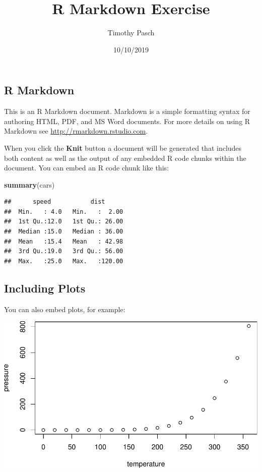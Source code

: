 \documentclass[]{article}
\title{R Markdown Exercise}
\author{Timothy Pasch}
\date{10/10/2019}
\newenvironment{Shaded}{\begin{snugshade}}{\end{snugshade}}
\newcommand{\KeywordTok}[1]{\textcolor[rgb]{0.13,0.29,0.53}{\textbf{#1}}}
\newcommand{\NormalTok}[1]{#1}
\begin{document}
\maketitle

\hypertarget{r-markdown}{%
\subsection{R Markdown}\label{r-markdown}}

This is an R Markdown document. Markdown is a simple formatting syntax
for authoring HTML, PDF, and MS Word documents. For more details on
using R Markdown see \url{http://rmarkdown.rstudio.com}.

When you click the \textbf{Knit} button a document will be generated
that includes both content as well as the output of any embedded R code
chunks within the document. You can embed an R code chunk like this:

\begin{Shaded}
\begin{Highlighting}[]
\KeywordTok{summary}\NormalTok{(cars)}
\end{Highlighting}
\end{Shaded}

\begin{verbatim}
##      speed           dist       
##  Min.   : 4.0   Min.   :  2.00  
##  1st Qu.:12.0   1st Qu.: 26.00  
##  Median :15.0   Median : 36.00  
##  Mean   :15.4   Mean   : 42.98  
##  3rd Qu.:19.0   3rd Qu.: 56.00  
##  Max.   :25.0   Max.   :120.00
\end{verbatim}

\hypertarget{including-plots}{%
\subsection{Including Plots}\label{including-plots}}

You can also embed plots, for example:

\includegraphics{Rmarkdown_files/figure-latex/pressure-1.pdf}
\end{document}
